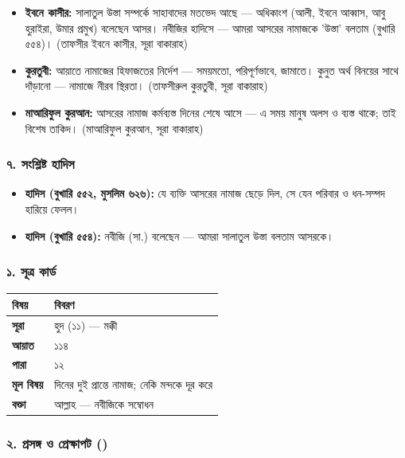\begin{itemize}
\item \textbf{ইবনে কাসীর:} সালাতুল উস্তা সম্পর্কে সাহাবাদের মতভেদ আছে — অধিকাংশ (আলী, ইবনে আব্বাস, আবু হুরাইরা, উমার প্রমুখ) বলেছেন আসর। নবীজির হাদিসে — আমরা আসরের নামাজকে 'উস্তা' বলতাম (বুখারি ৫৫৪)। (তাফসীর ইবনে কাসীর, সূরা বাকারাহ)
\item \textbf{কুরতুবী:} আয়াতে নামাজের হিফাজতের নির্দেশ — সময়মতো, পরিপূর্ণভাবে, জামাতে। কুনুত অর্থ বিনয়ের সাথে দাঁড়ানো — নামাজে নীরব স্থিরতা। (তাফসীরুল কুরতুবী, সূরা বাকারাহ)
\item \textbf{মাআরিফুল কুরআন:} আসরের নামাজ কর্মব্যস্ত দিনের শেষে আসে — এ সময় মানুষ অলস ও ব্যস্ত থাকে; তাই বিশেষ তাকিদ। (মাআরিফুল কুরআন, সূরা বাকারাহ)
\end{itemize}
\subsubsection*{৭. সংশ্লিষ্ট হাদিস}

\begin{itemize}
\item \textbf{হাদিস (বুখারি ৫৫২, মুসলিম ৬২৬):} যে ব্যক্তি আসরের নামাজ ছেড়ে দিল, সে যেন পরিবার ও ধন-সম্পদ হারিয়ে ফেলল।
\item \textbf{হাদিস (বুখারি ৫৫৪):} নবীজি (সা.) বলেছেন — আমরা সালাতুল উস্তা বলতাম আসরকে।
\end{itemize}
\subsubsection*{১. সূত্র কার্ড}

\begin{table}[h]\centering\small
\begin{tabular}{ll}
বিষয় & বিবরণ \\
\hline
\textbf{সূরা} & হুদ (১১) — মক্কী \\
\textbf{আয়াত} & ১১৪ \\
\textbf{পারা} & ১২ \\
\textbf{মূল বিষয়} & দিনের দুই প্রান্তে নামাজ; নেকি মন্দকে দূর করে \\
\textbf{বক্তা} & আল্লাহ — নবীজিকে সম্বোধন \\
\hline
\end{tabular}
\end{table}

\subsubsection*{২. প্রসঙ্গ ও প্রেক্ষাপট ()}

